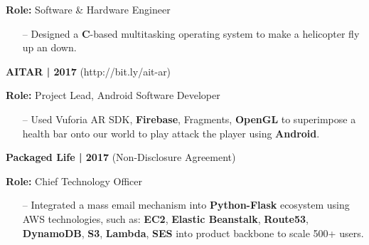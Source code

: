 \documentclass{article}
\begin{document}
\begin{multicols}{2}
{\footnotesize{
\newline\textbf{Role:} Software \& Hardware Engineer
\begin{itemize}
	\item[--] Designed a \textbf{C}-based multitasking operating system to make a helicopter fly up an down.
\end{itemize}
}}
\hfill \break
{\footnotesize{\textbf{AITAR | 2017} (http://bit.ly/ait-ar)}}
{\footnotesize{
\newline\textbf{Role:} Project Lead, Android Software Developer
\begin{itemize}
	\item[--] Used Vuforia AR SDK, \textbf{Firebase}, Fragments, \textbf{OpenGL} to superimpose a health bar onto our world to play attack the player using \textbf{Android}.
\end{itemize} 
}}
\hfill \break
\hfill \break
{\footnotesize{\textbf{Packaged Life | 2017} (Non-Disclosure Agreement)}}
{\footnotesize{
\newline\textbf{Role:} Chief Technology Officer
\begin{itemize}
	\item[--] Integrated a mass email mechanism into \textbf{Python-Flask} ecosystem using AWS technologies, such as: \textbf{EC2}, \textbf{Elastic Beanstalk}, \textbf{Route53}, \textbf{DynamoDB}, \textbf{S3}, \textbf{Lambda}, \textbf{SES} into product backbone to scale 500+ users.
\end{itemize} 
}}

\end{multicols}
\end{document}
